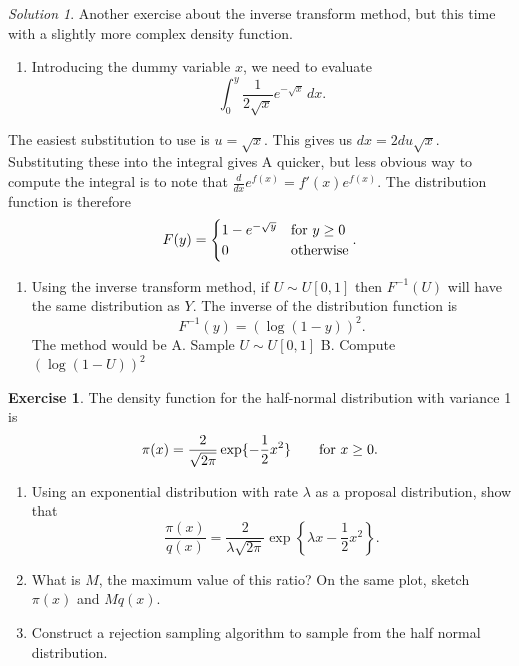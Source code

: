 \documentclass[
]{book}
\providecommand{\tightlist}{%
  \setlength{\itemsep}{0pt}\setlength{\parskip}{0pt}}
\theoremstyle{definition}
\theoremstyle{definition}
\theoremstyle{definition}
\newtheorem{exercise}{Exercise}[chapter]
\theoremstyle{definition}
\theoremstyle{remark}
\newtheorem*{solution}{Solution}
\begin{document}
\begin{solution}

Another exercise about the inverse transform method, but this time with a slightly more complex density function.

\begin{enumerate}
\def\labelenumi{\arabic{enumi}.}
\tightlist
\item
  Introducing the dummy variable \(x\), we need to evaluate
  \[
  \int_0^y \frac{1}{2\sqrt{x}}e^{-\sqrt{x}}\,dx.
  \]
\end{enumerate}

The easiest substitution to use is \(u = \sqrt{x}\). This gives us \(dx = 2du\sqrt{x}\). Substituting these into the integral gives
A quicker, but less obvious way to compute the integral is to note that \(\frac{d}{dx}e^{f(x)} = f'(x)e^{f(x)}\).
The distribution function is therefore
\[
F(y) = \begin{cases}
1 - e^{-\sqrt{y}} & \hbox{for } y \geq 0 \\
0  & \hbox{otherwise}
\end{cases}.
\]

\begin{enumerate}
\def\labelenumi{\arabic{enumi}.}
\setcounter{enumi}{1}
\tightlist
\item
  Using the inverse transform method, if \(U\sim U[0, 1]\) then \(F^{-1}(U)\) will have the same distribution as \(Y\). The inverse of the distribution function is
  \[
  F^{-1}(y) = (\log(1-y))^2.
  \]
  The method would be
  A. Sample \(U\sim U[0, 1]\)
  B. Compute \((\log(1-U))^2\)
\end{enumerate}

\end{solution}

\begin{exercise}

The density function for the half-normal distribution with variance 1 is
\[
\pi(x) = \frac{2}{\sqrt{2\pi}}\exp\{-\frac{1}{2}x^2\} \qquad \hbox{for } x \geq 0. 
\]

\begin{enumerate}
\def\labelenumi{\arabic{enumi}.}
\tightlist
\item
  Using an exponential distribution with rate \(\lambda\) as a proposal distribution, show that
  \[
   \frac{\pi(x)}{q(x)} = \frac{2}{\lambda\sqrt{2\pi}}\exp\left\{\lambda x - \frac{1}{2}x^2 \right\}.
   \]
\item
  What is \(M\), the maximum value of this ratio? On the same plot, sketch \(\pi(x)\) and \(Mq(x)\).
\item
  Construct a rejection sampling algorithm to sample from the half normal distribution.
\end{enumerate}

\end{exercise}
\end{document}
